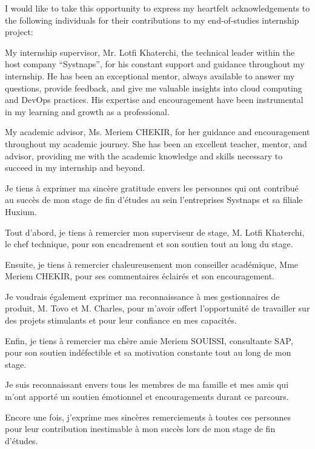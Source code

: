 \thispagestyle{empty}
\begin{center}
\end{center}
\vspace{0.8cm}        %

I would like to take this opportunity to express my heartfelt acknowledgements to the following individuals for their contributions to my end-of-studies internship project: 

My internship supervisor, Mr. Lotfi Khaterchi, the technical leader within the host company “Systnaps”, for his constant support and guidance throughout my internship. He has been an exceptional mentor, always available to answer my questions, provide feedback, and give me valuable insights into cloud computing and DevOps practices. His expertise and encouragement have been instrumental in my learning and growth as a professional. 

My academic advisor, Ms. Meriem CHEKIR, for her guidance and encouragement throughout my academic journey. She has been an excellent teacher, mentor, and advisor, providing me with the academic knowledge and skills necessary to succeed in my internship and beyond. 

\newpage
\thispagestyle{empty}
\begin{center}
\end{center}
\vspace{0.8cm}        %

Je tiens à exprimer ma sincère gratitude envers les personnes qui ont contribué au succès de mon stage de fin d'études au sein l’entreprises Systnaps et sa filiale Huxium. 

Tout d'abord, je tiens à remercier mon superviseur de stage, M. Lotfi Khaterchi, le chef technique, pour son encadrement et son soutien tout au long du stage.  

Ensuite, je tiens à remercier chaleureusement mon conseiller académique, Mme Meriem CHEKIR, pour ses commentaires éclairés et son encouragement. 

Je voudrais également exprimer ma reconnaissance à mes gestionnaires de produit, M. Tovo et M. Charles, pour m'avoir offert l'opportunité de travailler sur des projets stimulants et pour leur confiance en mes capacités. 

Enfin, je tiens à remercier ma chère amie Meriem SOUISSI, consultante SAP, pour son soutien indéfectible et sa motivation constante tout au long de mon stage. 

Je suis reconnaissant envers tous les membres de ma famille et mes amis qui m'ont apporté un soutien émotionnel et encouragements durant ce parcours. 

Encore une fois, j'exprime mes sincères remerciements à toutes ces personnes pour leur contribution inestimable à mon succès lors de mon stage de fin d'études.